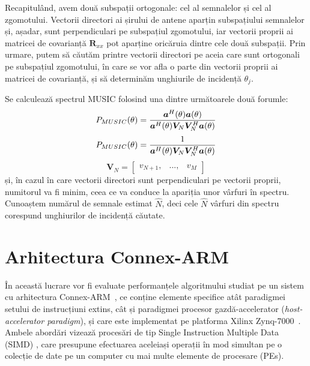 Recapitulând, avem două subspații ortogonale: cel al semnalelor și cel al
zgomotului. Vectorii directori ai șirului de antene aparțin subspațiului
semnalelor și, așadar, sunt perpendiculari pe subspațiul zgomotului, iar
vectorii proprii ai matricei de covarianță $\bm{R}_{xx}$ pot aparține oricăruia
dintre cele două subspații. Prin urmare, putem să căutăm printre vectorii
directori pe aceia care sunt ortogonali pe subspațiul zgomotului, în care se vor
afla o parte din vectorii proprii ai matricei de covarianță, și să determinăm
unghiurile de incidență $\theta_j$.

Se calculează spectrul MUSIC folosind una dintre următoarele două forumle:
\begin{equation}
    P_{MUSIC}(\theta) =
        \frac{\bm{a}^H(\theta)\bm{a}(\theta)}
             {\bm{a}^H(\theta)\bm{V}_N\bm{V}_N^H\bm{a}(\theta)} \\
\end{equation}
\begin{equation}
    P_{MUSIC}(\theta) =
        \frac{1}
             {\bm{a}^H(\theta)\bm{V}_N\bm{V}_N^H\bm{a}(\theta)} \\
\label{eq:music-spectrum}
\end{equation}
\begin{equation}
    \bm{V}_N = \begin{bmatrix}v_{N+1}, & ..., & v_M \end{bmatrix}
\end{equation}
și, în cazul în care vectorii directori sunt perpendiculari pe vectorii proprii,
numitorul va fi minim, ceea ce va conduce la apariția unor vârfuri în spectru.
Cunoaștem numărul de semnale estimat $\hat{N}$, deci cele $\hat{N}$
vârfuri din spectru corespund unghiurilor de incidență căutate.

\section{Arhitectura Connex-ARM}
\label{sec:cnx-arr}

În această lucrare vor fi evaluate performanțele algoritmului studiat pe un
sistem cu arhitectura Connex-ARM~\cite{energy-effective-simd}, ce conține
elemente specifice atât paradigmei setului de instrucțiuni extins, cât și
paradigmei procesor gazdă-accelerator (\textit{host-accelerator paradigm}), și care este
implementat pe platforma Xilinx Zynq-7000~\cite{zynq}.  Ambele
abordări vizează procesări de tip Single Instruction Multiple Data (SIMD)
, care presupune efectuarea
aceleiași operații în mod simultan pe o colecție de date pe un computer cu mai
multe elemente de procesare (PEs).  \\

